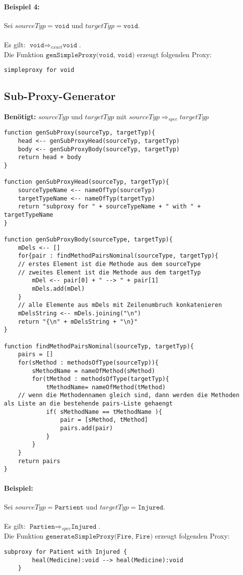 \documentclass[a4paper,12pt]{article}
\begin{document}
\paragraph{Beispiel 4:} Sei $sourceTyp = \texttt{void}$ und $targetTyp = \texttt{void}$.\\\\
Es gilt: $\texttt{void} \Rightarrow_{exact} \texttt{void}$.\\
Die Funktion $\texttt{genSimpleProxy(void, void)}$ erzeugt folgenden Proxy:
\begin{lstlisting}[style = dsl]
	simpleproxy for void
\end{lstlisting}

\pagebreak
\subsection{Sub-Proxy-Generator}

\textbf{Benötigt: }$sourceTyp$ und $targetTyp$ mit $sourceTyp \Rightarrow_{spec} targetTyp$
\begin{lstlisting}[style = generator]
function genSubProxy(sourceTyp, targetTyp){
	head <-- genSubProxyHead(sourceTyp, targetTyp)
	body <-- genSubProxyBody(sourceTyp, targetTyp)
	return head + body
}

function genSubProxyHead(sourceTyp, targetTyp){
	sourceTypeName <-- nameOfTyp(sourceTyp)
	targetTypeName <-- nameOfTyp(targetTyp)
	return "subproxy for " + sourceTypeName + " with " + targetTypeName
}

function genSubProxyBody(sourceType, targetTyp){
	mDels <-- []
	for{pair : findMethodPairsNominal(sourceType, targetTyp){
	// erstes Element ist die Methode aus dem sourceType
	// zweites Element ist die Methode aus dem targetTyp	
		mDel <-- pair[0] + " --> " + pair[1]
		mDels.add(mDel)
	}
	// alle Elemente aus mDels mit Zeilenumbruch konkatenieren
	mDelsString <-- mDels.joining("\n")	
	return "{\n" + mDelsString + "\n}"
}

function findMethodPairsNominal(sourceTyp, targetTyp){
	pairs = []
	for(sMethod : methodsOfType(sourceTyp)){
		sMethodName = nameOfMethod(sMethod)
		for(tMethod : methodsOfType(targetTyp){
			tMethodName= nameOfMethod(tMethod)
	// wenn die Methodennamen gleich sind, dann werden die Methoden als Liste an die bestehende pairs-Liste gehaengt
			if( sMethodName == tMethodName ){
				pair = [sMethod, tMethod]
				pairs.add(pair)
			}
		}
	}
	return pairs
}
\end{lstlisting}


\paragraph{Beispiel:} Sei $sourceTyp = \texttt{Partient}$ und $targetTyp = \texttt{Injured}$.\\\\
Es gilt: $\texttt{Partien} \Rightarrow_{spec} \texttt{Injured}$.\\
Die Funktion $\texttt{generateSimpleProxy(Fire, Fire)}$ erzeugt folgenden Proxy:
\begin{lstlisting}[style = dsl]
	subproxy for Patient with Injured {
		heal(Medicine):void --> heal(Medicine):void
	}
\end{lstlisting}
\end{document}
